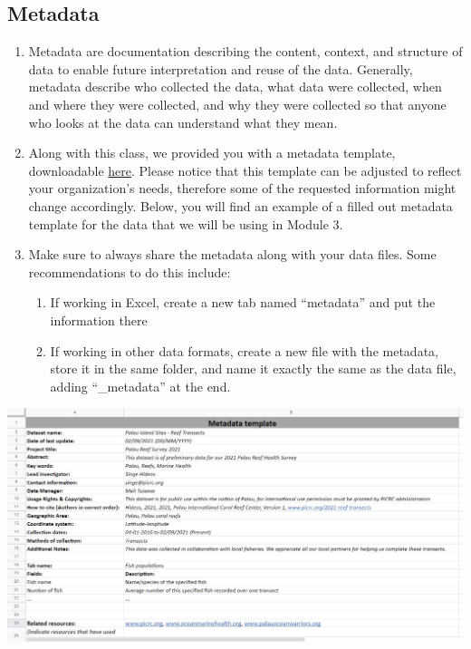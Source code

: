 \documentclass[
]{book}
\providecommand{\tightlist}{%
  \setlength{\itemsep}{0pt}\setlength{\parskip}{0pt}}
\begin{document}
\hypertarget{metadata}{%
\subsection{Metadata}\label{metadata}}

\begin{enumerate}
\def\labelenumi{\arabic{enumi}.}
\item
  Metadata are documentation describing the content, context, and structure of data to enable future interpretation and reuse of the data. Generally, metadata describe who collected the data, what data were collected, when and where they were collected, and why they were collected so that anyone who looks at the data can understand what they mean.
\item
  Along with this class, we provided you with a metadata template, downloadable \href{files/meatadata_template_blank.xlsx}{here}. Please notice that this template can be adjusted to reflect your organization's needs, therefore some of the requested information might change accordingly. Below, you will find an example of a filled out metadata template for the data that we will be using in Module 3.
\item
  Make sure to always share the metadata along with your data files. Some recommendations to do this include:

  \begin{enumerate}
  \def\labelenumii{\arabic{enumii}.}
  \tightlist
  \item
    If working in Excel, create a new tab named ``metadata'' and put the information there
  \item
    If working in other data formats, create a new file with the metadata, store it in the same folder, and name it exactly the same as the data file, adding ``\_metadata'' at the end.
  \end{enumerate}
\end{enumerate}

\includegraphics{images/m2s1_metadata_template_filled.jpg}
\end{document}
